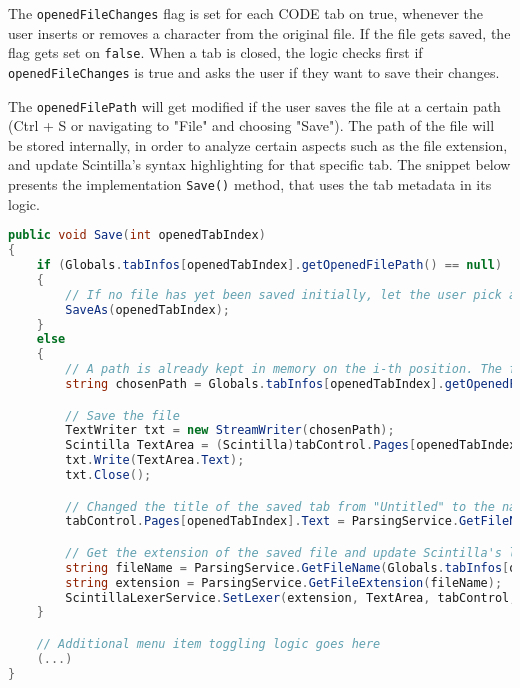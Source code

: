 The \texttt{openedFileChanges} flag is set for each CODE tab on true, whenever the user inserts or removes a character from the original file. If the file gets saved, the flag gets set on \texttt{false}. When a tab is closed, the logic checks first if \texttt{openedFileChanges} is true and asks the user if they want to save their changes.

The \texttt{openedFilePath} will get modified if the user saves the file at a certain path (Ctrl + S or navigating to "File" and choosing "Save"). The path of the file will be stored internally, in order to analyze certain aspects such as the file extension, and update Scintilla's syntax highlighting for that specific tab. The snippet below presents the implementation \texttt{Save()} method, that uses the tab metadata in its logic.

\begin{lstlisting}[language=csharp, caption={Pie's implementation of the Save() method, that gets triggered whenever the user wants to save a file inside a CODE tab}]
public void Save(int openedTabIndex)
{
    if (Globals.tabInfos[openedTabIndex].getOpenedFilePath() == null)
    {
        // If no file has yet been saved initially, let the user pick a path for their file. SaveAs() opens a SaveFileDialog before updating tab metadata and then writes to the output file
        SaveAs(openedTabIndex);
    }
    else
    {
        // A path is already kept in memory on the i-th position. The file should be saved in the same place
        string chosenPath = Globals.tabInfos[openedTabIndex].getOpenedFilePath();

        // Save the file
        TextWriter txt = new StreamWriter(chosenPath);
        Scintilla TextArea = (Scintilla)tabControl.Pages[openedTabIndex].Controls[0];
        txt.Write(TextArea.Text);
        txt.Close();

        // Changed the title of the saved tab from "Untitled" to the name of the file
        tabControl.Pages[openedTabIndex].Text = ParsingService.GetFileName(chosenPath);

        // Get the extension of the saved file and update Scintilla's lexer accordingly
        string fileName = ParsingService.GetFileName(Globals.tabInfos[openedTabIndex].getOpenedFilePath());
        string extension = ParsingService.GetFileExtension(fileName);
        ScintillaLexerService.SetLexer(extension, TextArea, tabControl, openedTabIndex);
    }

    // Additional menu item toggling logic goes here
    (...)
}
\end{lstlisting}

